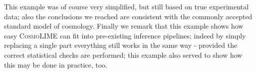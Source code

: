 This example was of course very simplified, but still based on true experimental data; also the conclusions we reached are consistent with the commonly accepted standard model of cosmology.
Finally we remark that this example shows how easy \textsc{CosmoLIME} can fit into pre-existing inference pipelines; indeed by simply replacing a single part everything still works in the same way - provided the correct statistical checks are performed; this example also served to show how this may be done in practice, too.